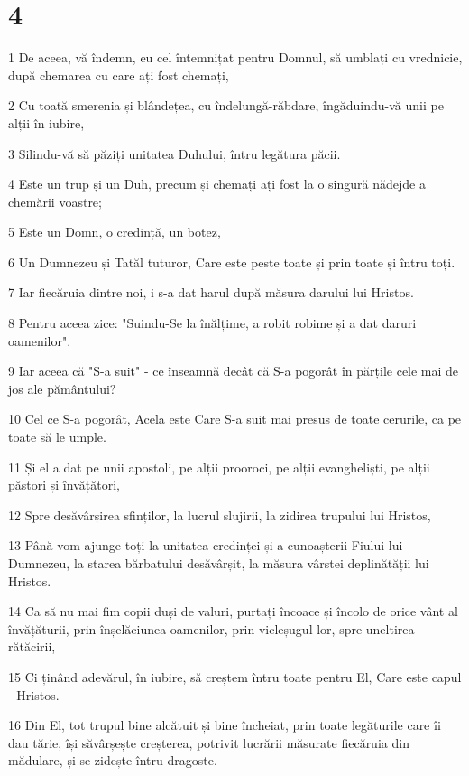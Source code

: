 \chapter{4}

\par 1 De aceea, vă îndemn, eu cel întemnițat pentru Domnul, să umblați cu vrednicie, după chemarea cu care ați fost chemați,
\par 2 Cu toată smerenia și blândețea, cu îndelungă-răbdare, îngăduindu-vă unii pe alții în iubire,
\par 3 Silindu-vă să păziți unitatea Duhului, întru legătura păcii.
\par 4 Este un trup și un Duh, precum și chemați ați fost la o singură nădejde a chemării voastre;
\par 5 Este un Domn, o credință, un botez,
\par 6 Un Dumnezeu și Tatăl tuturor, Care este peste toate și prin toate și întru toți.
\par 7 Iar fiecăruia dintre noi, i s-a dat harul după măsura darului lui Hristos.
\par 8 Pentru aceea zice: "Suindu-Se la înălțime, a robit robime și a dat daruri oamenilor".
\par 9 Iar aceea că "S-a suit" - ce înseamnă decât că S-a pogorât în părțile cele mai de jos ale pământului?
\par 10 Cel ce S-a pogorât, Acela este Care S-a suit mai presus de toate cerurile, ca pe toate să le umple.
\par 11 Și el a dat pe unii apostoli, pe alții prooroci, pe alții evangheliști, pe alții păstori și învățători,
\par 12 Spre desăvârșirea sfinților, la lucrul slujirii, la zidirea trupului lui Hristos,
\par 13 Până vom ajunge toți la unitatea credinței și a cunoașterii Fiului lui Dumnezeu, la starea bărbatului desăvârșit, la măsura vârstei deplinătății lui Hristos.
\par 14 Ca să nu mai fim copii duși de valuri, purtați încoace și încolo de orice vânt al învățăturii, prin înșelăciunea oamenilor, prin vicleșugul lor, spre uneltirea rătăcirii,
\par 15 Ci ținând adevărul, în iubire, să creștem întru toate pentru El, Care este capul - Hristos.
\par 16 Din El, tot trupul bine alcătuit și bine încheiat, prin toate legăturile care îi dau tărie, își săvârșește creșterea, potrivit lucrării măsurate fiecăruia din mădulare, și se zidește întru dragoste.
